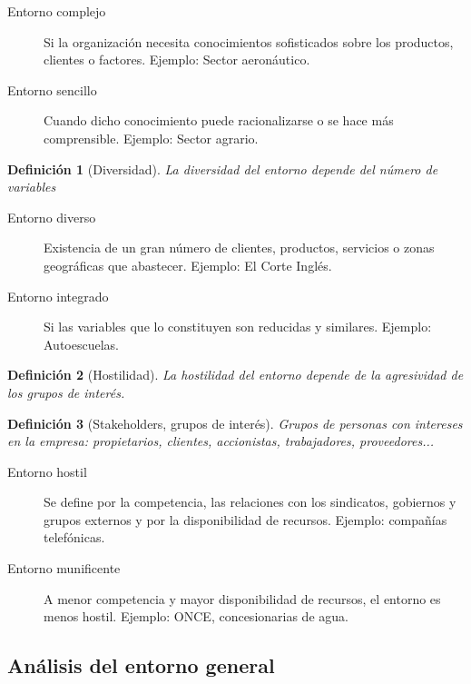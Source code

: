 \documentclass[12pt]{article}
\theoremstyle{definition_wo_parentheses}
\newtheorem{definicion}{Definición}[section]
\begin{document}
\begin{description}
\item[Entorno complejo]Si la organización necesita conocimientos sofisticados sobre los productos, clientes o factores. Ejemplo: Sector aeronáutico.
\item[Entorno sencillo] Cuando dicho conocimiento puede racionalizarse o se hace más comprensible. Ejemplo: Sector agrario.
\end{description}



\begin{definicion}[Diversidad]
La diversidad del entorno depende del número de variables
\end{definicion}

\begin{description}
\item[Entorno diverso] Existencia de un gran número de clientes, productos, servicios o zonas geográficas que abastecer. Ejemplo: El Corte Inglés.
\item[Entorno integrado] Si las variables que lo constituyen son reducidas y similares. Ejemplo: Autoescuelas.
\end{description}



\begin{definicion}[Hostilidad]
La hostilidad del entorno depende de la agresividad de los grupos de interés.
\end{definicion}

\begin{definicion}[Stakeholders, grupos de interés]
Grupos de personas con intereses en la empresa: propietarios, clientes, accionistas, trabajadores, proveedores...
\end{definicion}

\begin{description}
\item[Entorno hostil] Se define por la competencia, las relaciones con los sindicatos, gobiernos y grupos externos y por la disponibilidad de recursos. Ejemplo: compañías telefónicas.
\item[Entorno munificente] A menor competencia y mayor disponibilidad de recursos, el entorno es menos hostil. Ejemplo: ONCE, concesionarias de agua.
\end{description}

\subsection{Análisis del entorno general}
\end{document}
